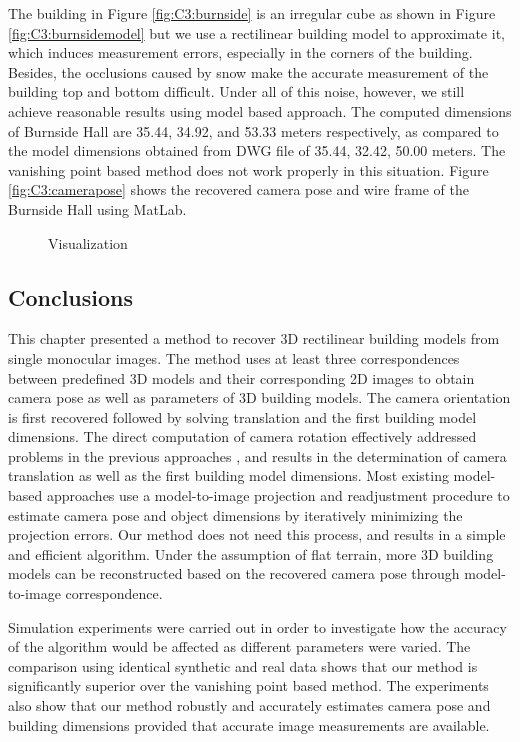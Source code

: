 The building in Figure \ref{fig:C3:burnside} is an irregular cube as shown in Figure \ref{fig:C3:burnsidemodel} but we use a rectilinear building model to approximate it, which induces measurement errors, especially in the corners of the building. Besides, the occlusions caused by snow make the accurate measurement of the building top and bottom difficult. Under all of this noise, however, we still achieve reasonable results using model based approach. The computed dimensions of Burnside Hall are 35.44, 34.92, and 53.33 meters respectively, as compared to the model dimensions obtained from DWG file of 35.44, 32.42, 50.00 meters. The vanishing point based method does not work properly in this situation. Figure \ref{fig:C3:camerapose} shows the recovered camera pose and wire frame of the Burnside Hall using MatLab.  

\begin{figure}[H]
\centering
{} 
\hspace{.1in}
\caption{Visualization}
\label{fig:C3:RealDataVisualization}
\end{figure}

\subsection{Conclusions}

This chapter presented a method to recover 3D rectilinear building models from single monocular images. The method uses at least three correspondences between predefined 3D models and their corresponding 2D images to obtain camera pose as well as parameters of 3D building models. The camera orientation is first recovered followed by solving translation and the first building model dimensions. The direct computation of camera rotation effectively addressed problems in the previous approaches \cite{Taylor95}, and results in the determination of camera translation as well as the first building model dimensions. Most existing model-based approaches \cite{Lowe91, Taylor95, Debevec96} use a model-to-image projection and readjustment procedure to estimate camera pose and object dimensions by iteratively minimizing the projection errors. Our method does not need this process, and results in a simple and efficient algorithm. Under the assumption of flat terrain, more 3D building models can be reconstructed based on the recovered camera pose through model-to-image correspondence.  

Simulation experiments were carried out in order to investigate how the accuracy of the algorithm would be affected as different parameters were varied. The comparison using identical synthetic and real data shows that our method is significantly superior over the vanishing point based method. The experiments also show that our method robustly and accurately estimates camera pose and building dimensions provided that accurate image measurements are available. 


